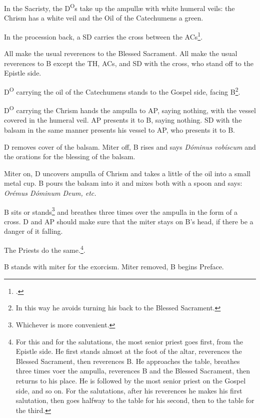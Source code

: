 \documentclass{report}
\begin{document}
\begin{multicols}{2}
    \rubric In the Sacristy, the D\textsuperscript{O}s take up the ampullæ with
    white humeral veils: the Chrism has a white veil and the Oil of the
    Catechumens a green.

    \rubric In the procession back, a SD carries the cross between the
    ACs\footcite[p. 187]{stehle}.

    \rubric All make the usual reverences to the Blessed Sacrament. All make
    the usual reverences to B except the TH, ACs, and SD with the cross, who
    stand off to the Epistle side.

    \rubric D\textsuperscript{O} carrying the oil of the Catechumens stands to
    the Gospel side, facing B\footnote{In this way he avoids turning his back
    to the Blessed Sacrament.}.

    \rubric D\textsuperscript{O} carrying the Chrism hands the ampulla to AP,
    saying nothing, with the vessel covered in the humeral veil. AP presents it
    to B, saying nothing. SD with the balsam in the same manner presents his
    vessel to AP, who presents it to B.

    \rubric D removes cover of the balsam. Miter off, B rises and says
    \textit{Dóminus vobíscum} and the orations for the blessing of the balsam.

    \rubric Miter on, D uncovers ampulla of Chrism and takes a little of the
    oil into a small metal cup. B pours the balsam into it and mixes both with
    a spoon and says: \textit{Orémus Dóminum Deum, etc.}

    \rubric B sits or stands\footnote{Whichever is more convenient.} and
    breathes three times over the ampulla in the form of a cross. D and AP
    should make sure that the miter stays on B's head, if there be a danger of
    it falling.

    \rubric The Priests do the same.\footnote{For this and for the salutations,
    the most senior priest goes first, from the Epistle side. He first stands
    almost at the foot of the altar, reverences the Blessed Sacrament, then
    reverences B. He approaches the table, breathes three times voer the
    ampulla, reverences B and the Blessed Sacrament, then returns to his place.
    He is followed by the most senior priest on the Gospel side, and so on. For
    the salutations, after his reverences he makes his first salutation, then
    goes halfway to the table for his second, then to the table for the
    third.}.

    \rubric B stands with miter for the exorcism. Miter removed, B begins
    Preface. 


\end{multicols}
\end{document}
